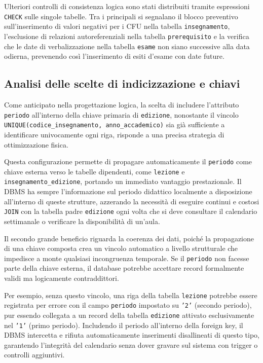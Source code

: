 Ulteriori controlli di consistenza logica sono stati distribuiti tramite espressioni \texttt{CHECK} sulle singole tabelle. Tra i principali si segnalano il blocco preventivo sull'inserimento di valori negativi per i CFU nella tabella \texttt{insegnamento}, l'esclusione di relazioni autoreferenziali nella tabella \texttt{prerequisito} e la verifica che le date di verbalizzazione nella tabella \texttt{esame} non siano successive alla data odierna, prevenendo così l'inserimento di esiti d'esame con date future.

\subsection{Analisi delle scelte di indicizzazione e chiavi}
\label{ssec:analisi-delle-scelte-di-indicizzazione-e-chiavi}

Come anticipato nella progettazione logica, la scelta di includere l'attributo \texttt{periodo} all'interno della chiave primaria di \texttt{edizione}, nonostante il vincolo \texttt{UNIQUE(codice\_insegnamento, anno\_accademico)} sia già sufficiente a identificare univocamente ogni riga, risponde a una precisa strategia di ottimizzazione fisica.

Questa configurazione permette di propagare automaticamente il \texttt{periodo} come chiave esterna verso le tabelle dipendenti, come \texttt{lezione} e \texttt{insegnamento\_edizione}, portando un immediato vantaggio prestazionale.
Il DBMS ha sempre l'informazione sul periodo didattico localmente a disposizione all'interno di queste strutture, azzerando la necessità di eseguire continui e costosi \texttt{JOIN} con la tabella padre \texttt{edizione} ogni volta che si deve consultare il calendario settimanale o verificare la disponibilità di un'aula.

Il secondo grande beneficio riguarda la coerenza dei dati, poiché la propagazione di una chiave composta crea un vincolo automatico a livello strutturale che impedisce a monte qualsiasi incongruenza temporale.
Se il \texttt{periodo} non facesse parte della chiave esterna, il database potrebbe accettare record formalmente validi ma logicamente contraddittori.

Per esempio, senza questo vincolo, una riga della tabella \texttt{lezione} potrebbe essere registrata per errore con il campo \texttt{periodo} impostato su \texttt{'2'} (secondo periodo), pur essendo collegata a un record della tabella \texttt{edizione} attivato esclusivamente nel \texttt{'1'} (primo periodo). Includendo il periodo all'interno della foreign key, il DBMS intercetta e rifiuta automaticamente inserimenti disallineati di questo tipo, garantendo l'integrità del calendario senza dover gravare sul sistema con trigger o controlli aggiuntivi.


